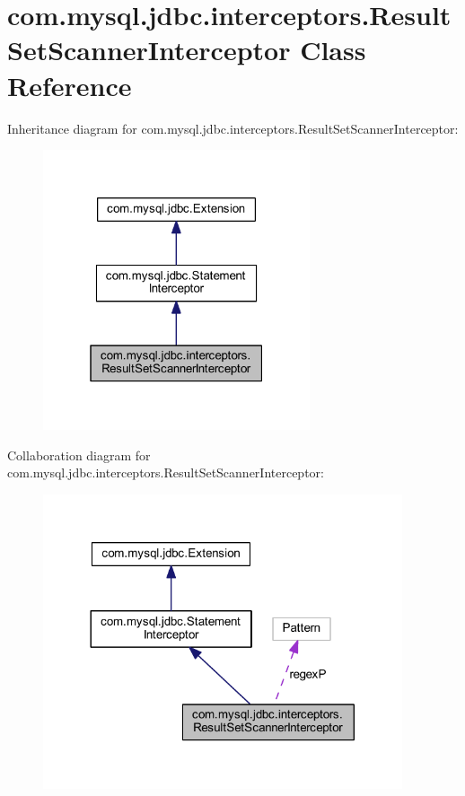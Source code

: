 \hypertarget{classcom_1_1mysql_1_1jdbc_1_1interceptors_1_1_result_set_scanner_interceptor}{}\section{com.\+mysql.\+jdbc.\+interceptors.\+Result\+Set\+Scanner\+Interceptor Class Reference}
\label{classcom_1_1mysql_1_1jdbc_1_1interceptors_1_1_result_set_scanner_interceptor}


Inheritance diagram for com.\+mysql.\+jdbc.\+interceptors.\+Result\+Set\+Scanner\+Interceptor\+:
\nopagebreak
\begin{figure}[H]
\begin{center}
\leavevmode
\includegraphics[width=223pt]{classcom_1_1mysql_1_1jdbc_1_1interceptors_1_1_result_set_scanner_interceptor__inherit__graph}
\end{center}
\end{figure}


Collaboration diagram for com.\+mysql.\+jdbc.\+interceptors.\+Result\+Set\+Scanner\+Interceptor\+:
\nopagebreak
\begin{figure}[H]
\begin{center}
\leavevmode
\includegraphics[width=300pt]{classcom_1_1mysql_1_1jdbc_1_1interceptors_1_1_result_set_scanner_interceptor__coll__graph}
\end{center}
\end{figure}
